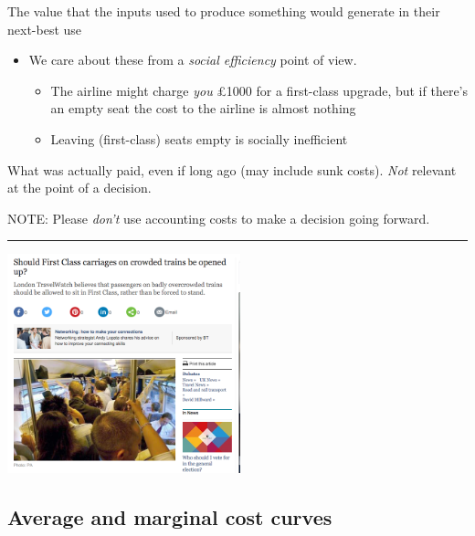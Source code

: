 \documentclass[]{article}
\providecommand{\tightlist}{%
  \setlength{\itemsep}{0pt}\setlength{\parskip}{0pt}}
\begin{document}
\begin{description}
\tightlist
\item[Opportunity Costs]
The value that the inputs used to produce something would generate in
their next-best use
\end{description}

\bigskip

\begin{itemize}
\tightlist
\item
  We care about these from a \emph{social efficiency} point of view.

  \begin{itemize}
  \tightlist
  \item
    The airline might charge \emph{you} £1000 for a first-class upgrade,
    but if there's an empty seat the cost to the airline is almost
    nothing
  \item
    Leaving (first-class) seats empty is socially inefficient
  \end{itemize}
\end{itemize}

\begin{description}
\tightlist
\item[Accounting costs]
What was actually paid, even if long ago (may include sunk costs).
\emph{Not} relevant at the point of a decision.
\end{description}

NOTE: Please \emph{don't} use accounting costs to make a decision going
forward.

\begin{center}\rule{0.5\linewidth}{\linethickness}\end{center}

\includegraphics[height=2.5in]{picsfigs/firstclass.png}

\hypertarget{average-and-marginal-cost-curves}{%
\subsection{Average and marginal cost
curves}\label{average-and-marginal-cost-curves}}
\end{document}
